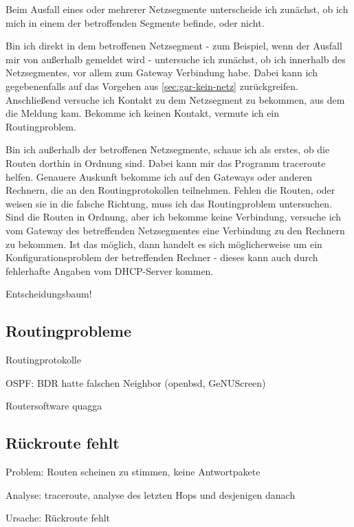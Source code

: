 \begin{normaltext}
  Beim Ausfall eines oder mehrerer Netzsegmente unterscheide ich zunächst, ob
  ich mich in einem der betroffenden Segmente befinde, oder nicht.

  Bin ich direkt in dem betroffenen Netzsegment - zum Beispiel, wenn der
  Ausfall mir von außerhalb gemeldet wird - untersuche ich zunächst, ob ich
  innerhalb des Netzsegmentes, vor allem zum Gateway Verbindung habe.
  Dabei kann ich gegebenenfalls auf das Vorgehen aus
  \ref{sec:gar-kein-netz} zurückgreifen.
  Anschließend versuche ich Kontakt zu dem Netzsegment zu bekommen, aus dem
  die Meldung kam. Bekomme ich keinen Kontakt, vermute ich ein Routingproblem.

  Bin ich außerhalb der betroffenen Netzsegmente, schaue ich als erstes, ob
  die Routen dorthin in Ordnung sind. Dabei kann mir das Programm traceroute
  helfen. Genauere Auskunft bekomme ich auf den Gateways oder anderen
  Rechnern, die an den Routingprotokollen teilnehmen. Fehlen die Routen, oder
  weisen sie in die falsche Richtung, muss ich das Routingproblem untersuchen.
  Sind die Routen in Ordnung, aber ich bekomme keine Verbindung, versuche ich
  vom Gateway des betreffenden Netzsegmentes eine Verbindung zu den Rechnern
  zu bekommen. Ist das möglich, dann handelt es sich möglicherweise um ein
  Konfigurationsproblem der betreffenden Rechner - dieses kann auch durch
  fehlerhafte Angaben vom DHCP-Server kommen.
\end{normaltext}

\begin{notes}
\item Entscheidungsbaum!
\end{notes}

\subsection*{Routingprobleme}
\label{sec:routingprobleme}

\begin{notes}
\item Routingprotokolle
\item OSPF: BDR hatte falschen Neighbor (openbsd, GeNUScreen)
\item Routersoftware quagga
\end{notes}

\subsection*{Rückroute fehlt}
\label{sec:rueckroute-fehlt}

\begin{notes}
\item Problem: Routen scheinen zu stimmen, keine Antwortpakete
\item Analyse: traceroute, analyse des letzten Hops und desjenigen danach
\item Ursache: Rückroute fehlt
\end{notes}

